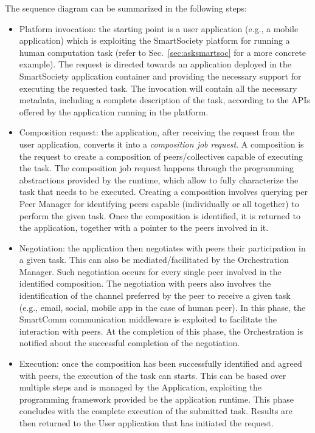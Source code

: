 The sequence diagram can be summarized in the following steps:
\begin{itemize}
\item Platform invocation: the starting point is a user application (e.g., a mobile application) which is exploiting the SmartSociety platform for running a human computation task (refer to Sec.~\ref{sec:asksmartsoc} for a more concrete example). The request is directed towards an application deployed in the SmartSociety application container and providing the necessary support for executing the requested task. The invocation will contain all the necessary metadata, including a complete description of the task, according to the APIs offered by the application running in the platform.

\item Composition request: the application, after receiving the request from the user application, converts it into a \textit{composition job request}. A composition is the request to create a composition of peers/collectives capable of executing the task. The composition job request happens through the programming abstractions provided by the runtime, which allow to fully characterize the task that needs to be executed. Creating a composition involves querying per Peer Manager for identifying peers capable (individually or all together) to perform the given task. Once the composition is identified, it is returned to the application, together with a pointer to the peers involved in it.

\item  Negotiation: the application then negotiates with peers their participation in a given task. This can also be mediated/facilitated by the Orchestration Manager. Such negotiation occurs for every single peer involved in the identified composition. The negotiation with peers also involves the identification of the channel preferred by the peer to receive a given task (e.g., email, social, mobile app in the case of human peer). In this phase, the SmartComm communication middleware is exploited to facilitate the interaction with peers. At the completion of this phase, the Orchestration is notified about the successful completion of the negotiation.

\item Execution: once the composition has been successfully identified and agreed with peers, the execution of the task can starts. This can be based over multiple steps and is managed by the Application, exploiting the programming framework provided be the application runtime. This phase concludes with the complete execution of the submitted task. Results are then returned to the User application that has initiated the request.

\end{itemize}


